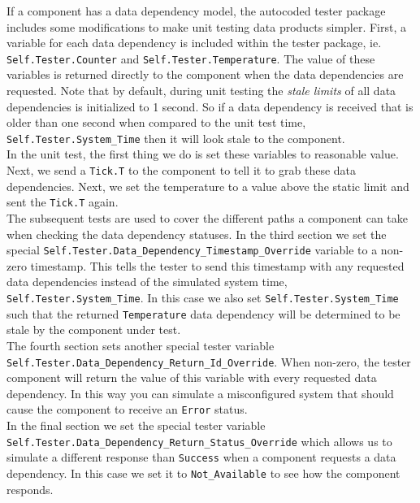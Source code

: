 If a component has a data dependency model, the autocoded tester package includes some modifications to make unit testing data products simpler. First, a variable for each data dependency is included within the tester package, ie. \texttt{Self.Tester.Counter} and \texttt{Self.Tester.Temperature}. The value of these variables is returned directly to the component when the data dependencies are requested. Note that by default, during unit testing the \textit{stale limits} of all data dependencies is initialized to 1 second. So if a data dependency is received that is older than one second when compared to the unit test time, \texttt{Self.Tester.System\_Time} then it will look stale to the component. \\

In the unit test, the first thing we do is set these variables to reasonable value. Next, we send a \texttt{Tick.T} to the component to tell it to grab these data dependencies. Next, we set the temperature to a value above the static limit and sent the \texttt{Tick.T} again. \\

The subsequent tests are used to cover the different paths a component can take when checking the data dependency statuses. In the third section we set the special \texttt{Self.Tester.Data\_Dependency\_Timestamp\_Override} variable to a non-zero timestamp. This tells the tester to send this timestamp with any requested data dependencies instead of the simulated system time, \texttt{Self.Tester.System\_Time}. In this case we also set \texttt{Self.Tester.System\_Time} such that the returned \texttt{Temperature} data dependency will be determined to be stale by the component under test. \\

The fourth section sets another special tester variable \texttt{Self.Tester.Data\_Dependency\_Return\_Id\_Override}. When non-zero, the tester component will return the value of this variable with every requested data dependency. In this way you can simulate a misconfigured system that should cause the component to receive an \texttt{Error} status. \\

In the final section we set the special tester variable \texttt{Self.Tester.Data\_Dependency\_Return\_Status\_Override} which allows us to simulate a different response than \texttt{Success} when a component requests a data dependency. In this case we set it to \texttt{Not\_Available} to see how the component responds. \\


